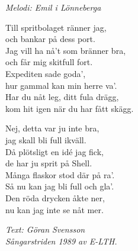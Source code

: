 {\footnotesize\textit{Melodi: Emil i Lönneberga}}\par
\vspace{10pt}
Till spritbolaget ränner jag,\\
och bankar på dess port.\\
Jag vill ha nå't som bränner bra,\\
och får mig skitfull fort.\\
Expediten sade goda',\\
hur gammal kan min herre va'.\\
Har du nåt leg, ditt fula drägg,\\
kom hit igen när du har fått skägg.\par
\vspace{10pt}
Nej, detta var ju inte bra,\\
jag skall bli full ikväll.\\
Då plötsligt en idé jag fick,\\
de har ju sprit på Shell.\\
Många flaskor stod där på ra'.\\
Så nu kan jag bli full och gla'.\\
Den röda drycken åkte ner,\\
nu kan jag inte se nåt mer.\par
\vspace{10pt}
{\footnotesize\textit{Text: Göran Svensson \\ Sångarstriden 1989 av
    E-LTH.}}
